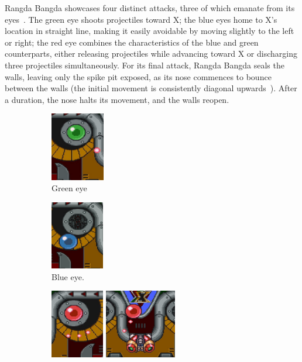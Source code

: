 Rangda Bangda showcases four distinct attacks, three of which emanate from its eyes~\cite{wiki:Rangda_bangda}. The green eye shoots projectiles toward X; the blue eyes home to X's location in straight line, making it easily avoidable by moving slightly to the left or right; the red eye combines the characteristics of the blue and green counterparts, either releasing projectiles while advancing toward X or discharging three projectiles simultaneously. For its final attack, Rangda Bangda seals the walls, leaving only the spike pit exposed, as its nose commences to bounce between the walls (the initial movement is consistently diagonal upwards~\cite{stratwiki:Sigma_stage_2}). After a duration, the nose halts its movement, and the walls reopen.

\begin{figure}[htp]
	\centering
	\begin{subfigure}[t]{.2\linewidth}
		\centering
		\includegraphics[height=3cm]{figures/X1/Sigma_stages/Rangda_green.jpg}
		\caption{Green eye}
	\end{subfigure}
	\begin{subfigure}[t]{.2\linewidth}
		\centering
		\includegraphics[height=3cm]{figures/X1/Sigma_stages/Rangda_blue.jpg}
		\caption{Blue eye.}
	\end{subfigure}
	\begin{subfigure}[t]{.5\linewidth}
		\centering
		\includegraphics[height=3cm]{figures/X1/Sigma_stages/Rangda_red_1.jpg}
		\includegraphics[height=3cm]{figures/X1/Sigma_stages/Rangda_red_2.jpg}

\end{subfigure}
\end{figure}
